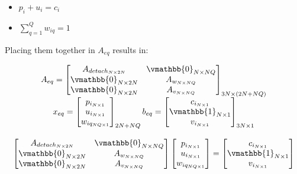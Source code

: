 \documentclass[letterpaper, 10pt, conference]{IEEEtran}
\begin{document}
\begin{itemize}
\item
  \(p_i + u_i = c_i\)
\item
  \(\sum_{q=1}^Q w_{iq} = 1\)
\end{itemize}

Placing them together in \(A_{eq}\) results in:

\begin{equation}
\begin{array}{c}
    A_{eq} =
    \begin{bmatrix}
        A_{detach_{N \times 2N}} & \vmathbb{0}_{N \times NQ} \\
        \vmathbb{0}_{N \times 2N} & A_{w_{N \times NQ}}      \\
        \vmathbb{0}_{N \times 2N} & A_{v_{N \times NQ}}      \\
    \end{bmatrix}_{3N \times (2N + NQ)} \\
    x_{eq} =
    \begin{bmatrix}
        p_{i_{N \times 1}} \\
        u_{i_{N \times 1}} \\
        w_{iq_{NQ \times 1}} \\
    \end{bmatrix}_{2N + NQ}
    b_{eq} =
    \begin{bmatrix}
        c_{i_{N \times 1}} \\
        \vmathbb{1}_{N \times 1} \\
        v_{i_{N \times 1}} \\
    \end{bmatrix}_{3N \times 1} \\
    \\
    \begin{bmatrix}
        A_{detach_{N \times 2N}}    & \vmathbb{0}_{N \times NQ} \\
        \vmathbb{0}_{N \times 2N} & A_{w_{N \times NQ}}          \\
        \vmathbb{0}_{N \times 2N} & A_{v_{N \times NQ}}          \\
    \end{bmatrix}
    \begin{bmatrix}
        p_{i_{N \times 1}} \\
        u_{i_{N \times 1}} \\
        w_{iq_{NQ \times 1}} \\
    \end{bmatrix}
    =
    \begin{bmatrix}
        c_{i_{N \times 1}} \\
        \vmathbb{1}_{N \times 1} \\
        v_{i_{N \times 1}} \\
    \end{bmatrix}
\end{array}
\end{equation}
\end{document}
